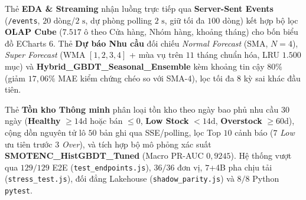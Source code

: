 \medskip

Thẻ \textbf{EDA \& Streaming} nhận luồng trực tiếp qua \textbf{Server-Sent Events} (\texttt{/events}, $20$ dòng/$2\text{ s}$, dự phòng polling $2\text{ s}$, giữ tối đa $100$ dòng) kết hợp bộ lọc \textbf{OLAP Cube} ($7.517$ ô theo Cửa hàng, Nhóm hàng, khoảng tháng) cho bốn biểu đồ ECharts 6. Thẻ \textbf{Dự báo Nhu cầu} đối chiếu \textit{Normal Forecast} (SMA, $N=4$), \textit{Super Forecast} (WMA $[1,2,3,4]$ + mùa vụ trên $11$ tháng chuẩn hóa, LRU $1.500$ mục) và \textbf{Hybrid\_GBDT\_Seasonal\_Ensemble} kèm khoảng tin cậy $80\%$ (giảm $17{,}06\%$ MAE kiểm chứng chéo so với SMA-4), lọc tối đa $8$ kỳ sai khác đầu tiên.

\medskip

Thẻ \textbf{Tồn kho Thông minh} phân loại tồn kho theo ngày bao phủ nhu cầu $30$ ngày (\textbf{Healthy} $\ge 14\text{d}$ hoặc bán $\le 0$, \textbf{Low Stock} $< 14\text{d}$, \textbf{Overstock} $\ge 60\text{d}$), cộng dồn nguyên tử lô $50$ bản ghi qua SSE/polling, lọc Top $10$ cảnh báo ($7$ \textit{Low} ưu tiên trước $3$ \textit{Over}), và tích hợp bộ mô phỏng xác suất \textbf{SMOTENC\_HistGBDT\_Tuned} (Macro PR-AUC $0{,}9245$). Hệ thống vượt qua $129/129$ E2E (\texttt{test_endpoints.js}), $36/36$ đơn vị, $7$+4B pha chịu tải (\texttt{stress_test.js}), đối đẳng Lakehouse (\texttt{shadow_parity.js}) và $8/8$ Python \texttt{pytest}.

